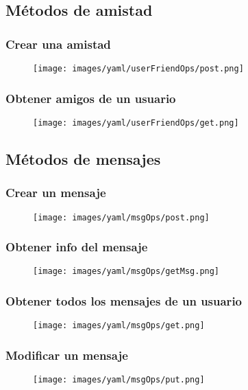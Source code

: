 \documentclass[12pt,a4paper, spanish]{article}
\begin{document}
\newpage
\subsection{Métodos de amistad}
\subsubsection{Crear una amistad}
\begin{figure}[H]
	\centering
	\texttt{[image: images/yaml/userFriendOps/post.png]}
\end{figure}
\subsubsection{Obtener amigos de un usuario}
\begin{figure}[H]
	\centering
	\texttt{[image: images/yaml/userFriendOps/get.png]}
\end{figure}

\newpage
\subsection{Métodos de mensajes}
\subsubsection{Crear un mensaje}
\begin{figure}[H]
	\centering
	\texttt{[image: images/yaml/msgOps/post.png]}
\end{figure}
\subsubsection{Obtener info del mensaje}
\begin{figure}[H]
	\centering
	\texttt{[image: images/yaml/msgOps/getMsg.png]}
\end{figure}
\subsubsection{Obtener todos los mensajes de un usuario}
\begin{figure}[H]
	\centering
	\texttt{[image: images/yaml/msgOps/get.png]}
\end{figure}
\subsubsection{Modificar un mensaje}
\begin{figure}[H]
	\centering
	\texttt{[image: images/yaml/msgOps/put.png]}
\end{figure}
\end{document}
